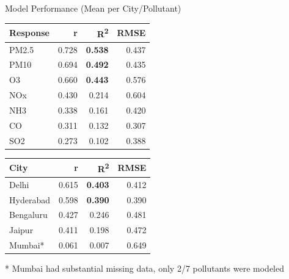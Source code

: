 \documentclass[svgnames, 12pt]{beamer}
\begin{document}
\begin{frame}{Model Performance (Mean per City/Pollutant)}
    \fontsize{11}{13}\selectfont
    \begin{table}
    \centering
    \begin{tabular}{lrrr}
    \hline
    Response & r & R\textsuperscript{2} & RMSE \\
    \hline
    PM2.5 & 0.728 & \textbf{0.538} & 0.437 \\
    PM10 & 0.694 & \textbf{0.492} & 0.435 \\
    O3 & 0.660 & \textbf{0.443} & 0.576 \\
    NOx & 0.430 & 0.214 & 0.604 \\
    NH3 & 0.338 & 0.161 & 0.420 \\
    CO & 0.311 & 0.132 & 0.307 \\
    SO2 & 0.273 & 0.102 & 0.388 \\
    \hline
    \end{tabular}
    \end{table}
    
    \begin{table}
    \centering
    \begin{tabular}{lrrr}
    \hline
    City & r & R\textsuperscript{2} & RMSE \\
    \hline
    Delhi & 0.615 & \textbf{0.403} & 0.412 \\
    Hyderabad & 0.598 & \textbf{0.390} & 0.390 \\
    Bengaluru & 0.427 & 0.246 & 0.481 \\
    Jaipur & 0.411 & 0.198 & 0.472 \\
    Mumbai* & 0.061 & 0.007 & 0.649 \\
    \hline
    \end{tabular}
    \end{table}
    \begin{center}
    \footnotesize{* Mumbai had substantial missing data, only 2/7 pollutants were modeled}
    \end{center}
\end{frame}
\end{document}
